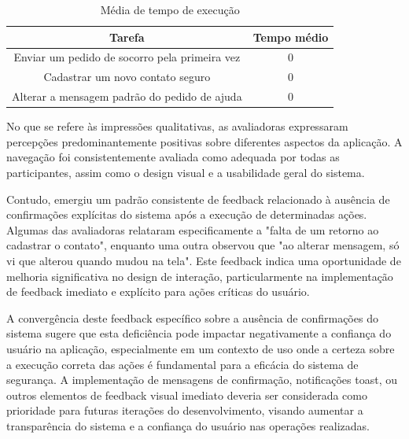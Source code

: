 \begin{table}[htbp]
	\centering
	\caption[Média de tempo de execução]{Média de tempo de execução}
	\label{tab:mediadetempo}
	\begin{tabular}{cc}
		\hline
		\multicolumn{1}{|c|}{Tarefa}                                        & \multicolumn{1}{c|}{Tempo médio}            \\ \hline \hline
		\multicolumn{1}{|c|}{Enviar um pedido de socorro pela primeira vez} & \multicolumn{1}{c|}{0} \\ \hline
		\multicolumn{1}{|c|}{Cadastrar um novo contato seguro}              & \multicolumn{1}{c|}{0} \\ \hline
		\multicolumn{1}{|c|}{Alterar a mensagem padrão do pedido de ajuda}  & \multicolumn{1}{c|}{0} \\ \hline
	\end{tabular}
\end{table}


No que se refere às impressões qualitativas, as avaliadoras expressaram percepções predominantemente positivas sobre diferentes aspectos da aplicação. A navegação foi consistentemente avaliada como adequada por todas as participantes, assim como o design visual e a usabilidade geral do sistema.

Contudo, emergiu um padrão consistente de feedback relacionado à ausência de confirmações explícitas do sistema após a execução de determinadas ações. Algumas das avaliadoras relataram especificamente a "falta de um retorno ao cadastrar o contato", enquanto uma outra observou que "ao alterar mensagem, só vi que alterou quando mudou na tela". Este feedback indica uma oportunidade de melhoria significativa no design de interação, particularmente na implementação de feedback imediato e explícito para ações críticas do usuário.

A convergência deste feedback específico sobre a ausência de confirmações do sistema sugere que esta deficiência pode impactar negativamente a confiança do usuário na aplicação, especialmente em um contexto de uso onde a certeza sobre a execução correta das ações é fundamental para a eficácia do sistema de segurança. A implementação de mensagens de confirmação, notificações toast, ou outros elementos de feedback visual imediato deveria ser considerada como prioridade para futuras iterações do desenvolvimento, visando aumentar a transparência do sistema e a confiança do usuário nas operações realizadas.
